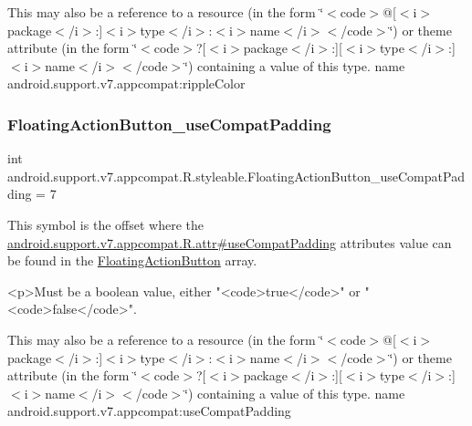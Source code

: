 This may also be a reference to a resource (in the form \char`\"{}$<$code$>$@\mbox{[}$<$i$>$package$<$/i$>$\+:\mbox{]}$<$i$>$type$<$/i$>$\+:$<$i$>$name$<$/i$>$$<$/code$>$\char`\"{}) or theme attribute (in the form \char`\"{}$<$code$>$?\mbox{[}$<$i$>$package$<$/i$>$\+:\mbox{]}\mbox{[}$<$i$>$type$<$/i$>$\+:\mbox{]}$<$i$>$name$<$/i$>$$<$/code$>$\char`\"{}) containing a value of this type.  name android.\+support.\+v7.\+appcompat\+:ripple\+Color \mbox{\label{classandroid_1_1support_1_1v7_1_1appcompat_1_1R_1_1styleable_ae8d13a787b0f198873c19c0c9ffbf158}} 
\subsubsection{\texorpdfstring{Floating\+Action\+Button\+\_\+use\+Compat\+Padding}{FloatingActionButton\_useCompatPadding}}
{\footnotesize\ttfamily int android.\+support.\+v7.\+appcompat.\+R.\+styleable.\+Floating\+Action\+Button\+\_\+use\+Compat\+Padding = 7\hspace{0.3cm}{\ttfamily [static]}}

This symbol is the offset where the \hyperlink{classandroid_1_1support_1_1v7_1_1appcompat_1_1R_1_1attr_a41d5d117864ce88df8ccd7fb51d7f54d}{android.\+support.\+v7.\+appcompat.\+R.\+attr\#use\+Compat\+Padding} attribute\textquotesingle{}s value can be found in the \hyperlink{classandroid_1_1support_1_1v7_1_1appcompat_1_1R_1_1styleable_a9bfca89352160169125a89277e9fb2a1}{Floating\+Action\+Button} array.

\begin{DoxyVerb}      <p>Must be a boolean value, either "<code>true</code>" or "<code>false</code>".
\end{DoxyVerb}
 

This may also be a reference to a resource (in the form \char`\"{}$<$code$>$@\mbox{[}$<$i$>$package$<$/i$>$\+:\mbox{]}$<$i$>$type$<$/i$>$\+:$<$i$>$name$<$/i$>$$<$/code$>$\char`\"{}) or theme attribute (in the form \char`\"{}$<$code$>$?\mbox{[}$<$i$>$package$<$/i$>$\+:\mbox{]}\mbox{[}$<$i$>$type$<$/i$>$\+:\mbox{]}$<$i$>$name$<$/i$>$$<$/code$>$\char`\"{}) containing a value of this type.  name android.\+support.\+v7.\+appcompat\+:use\+Compat\+Padding \mbox{\label{classandroid_1_1support_1_1v7_1_1appcompat_1_1R_1_1styleable_ad3fca4982ac43d82ecd05796cc15eef9}} 
